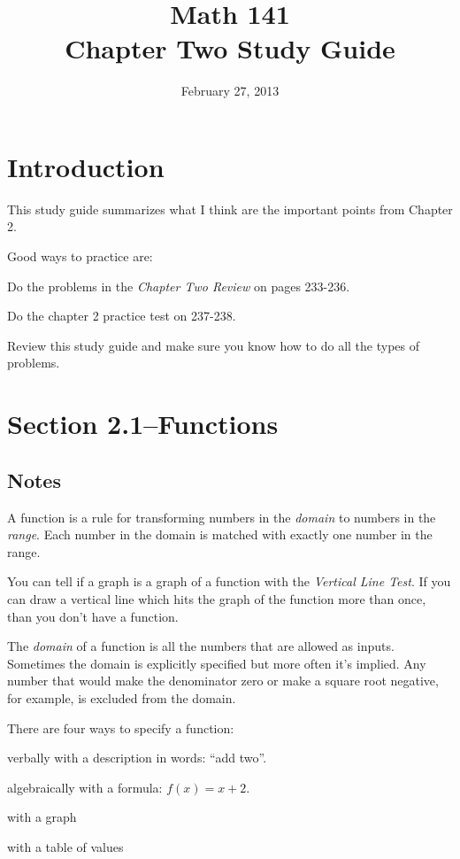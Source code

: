 \documentclass{article}
\title{Math 141 \\ Chapter Two Study Guide}
\date{February 27, 2013}
\begin{document}
\maketitle
\tableofcontents

\section{Introduction}

This study guide summarizes what I think are the important points from Chapter 2.

Good ways to practice are:
\begin{itemize*}
  \item Do the problems in the {\em Chapter Two Review} on pages 233-236.
  \item Do the chapter 2 practice test on 237-238.
  \item Review this study guide and make sure you know how to do all the types of problems.
\end{itemize*}

\section{Section 2.1--Functions}

\subsection{Notes}

A function is a rule for transforming numbers in the {\em domain} to numbers in the {\em range}.  Each number in the
domain is matched with exactly one number in the range.

You can tell if a graph is a graph of a function with the {\em Vertical Line Test}.  If you can draw a vertical line
which hits the graph of the function more than once, than you don't have a function.

The {\em domain} of a function is all the numbers that are allowed as inputs.  Sometimes the domain is explicitly
specified but more often it's implied.  Any number that would make the denominator zero or make a square root negative,
for example, is excluded from the domain.

There are four ways to specify a function:
\begin{itemize*}
  \item verbally with a description in words: ``add two''.
  \item algebraically with a formula: $f(x) = x + 2$.
  \item with a graph 
  \item with a table of values
\end{itemize*}
\end{document}
